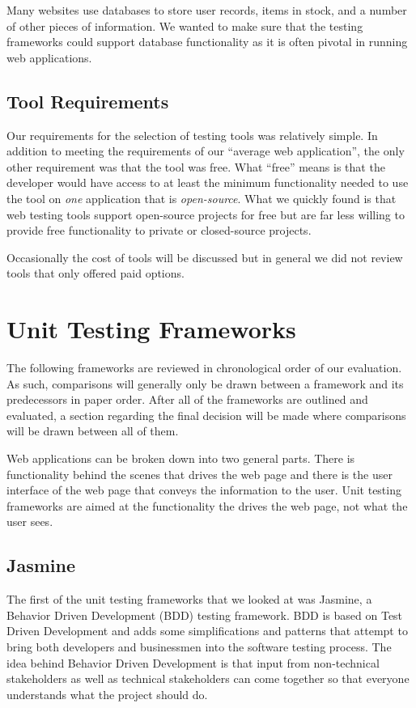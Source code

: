 \documentclass[12pt]{ucthesis}
\begin{document}
Many websites use databases to store user records, items in stock, and a number of other pieces of information. We wanted to make sure that the testing frameworks could support database functionality as it is often pivotal in running web applications.

\subsection{Tool Requirements}
Our requirements for the selection of testing tools was relatively simple. In addition to meeting the requirements of our ``average web application'', the only other requirement was that the tool was free. What ``free'' means is that the developer would have access to at least the minimum functionality needed to use the tool on \emph{one} application that is \emph{open-source}. What we quickly found is that web testing tools support open-source projects for free but are far less willing to provide free functionality to private or closed-source projects. 

Occasionally the cost of tools will be discussed but in general we did not review tools that only offered paid options.

\section{Unit Testing Frameworks}
The following frameworks are reviewed in chronological order of our evaluation. As such, comparisons will generally only be drawn between a framework and its predecessors in paper order. After all of the frameworks are outlined and evaluated, a section regarding the final decision will be made where comparisons will be drawn between all of them. 

Web applications can be broken down into two general parts. There is functionality behind the scenes that drives the web page and there is the user interface of the web page that conveys the information to the user. Unit testing frameworks are aimed at the functionality the drives the web page, not what the user sees.

\subsection{Jasmine}
The first of the unit testing frameworks that we looked at was Jasmine\cite{Jasmine}, a Behavior Driven Development (BDD) testing framework. BDD is based on Test Driven Development and adds some simplifications and patterns that attempt to bring both developers and businessmen into the software testing process. The idea behind Behavior Driven Development is that input from non-technical stakeholders as well as technical stakeholders can come together so that everyone understands what the project should do.
\end{document}
